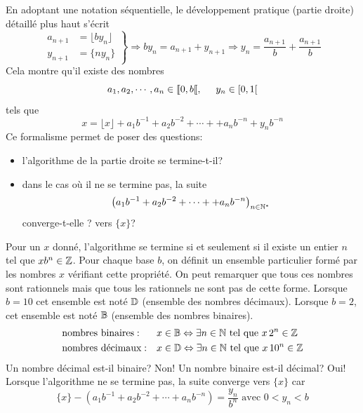 En adoptant une notation séquentielle, le développement pratique (partie droite) détaillé plus haut s'écrit
\begin{displaymath}
\left. 
\begin{aligned}
  a_{n+1} &= \lfloor by_n\rfloor \\ y_{n+1} &= \{ny_n\}
\end{aligned}
\right\rbrace
\Rightarrow by_n = a_{n+1} + y_{n+1}
\Rightarrow y_n = \frac{a_{n+1}}{b} + \frac{a_{n+1}}{b}
\end{displaymath}
Cela montre qu'il existe des nombres 
\begin{displaymath}
a_1, a_2, \cdots, a_n \in \llbracket 0, b\llbracket, \hspace{0.5cm} y_n \in [0,1[  
\end{displaymath}
tels que 
\begin{displaymath}
  x = \lfloor x \rfloor + a_1b^{-1} + a_2b^{-2} + \cdots + + a_nb^{-n} + y_nb^{-n}  
\end{displaymath}
Ce formalisme permet de poser des questions:
\begin{itemize}
  \item l'algorithme de la partie droite se termine-t-il?
  \item dans le cas où il ne se termine pas, la suite 
\begin{displaymath}
  \left( a_1b^{-1} + a_2b^{-2} + \cdots + + a_nb^{-n}\right)_{n\in \mathbb{N}^*}
\end{displaymath}
converge-t-elle ? vers $\{x\}$?
\end{itemize}
Pour un $x$ donné, l'algorithme se termine si et seulement si il existe un entier $n$ tel que $xb^n \in \mathbb{Z}$. Pour chaque base $b$, on définit un ensemble particulier formé par les nombres $x$ vérifiant cette propriété. On peut remarquer que tous ces nombres sont rationnels mais que tous les rationnels ne sont pas de cette forme. Lorsque $b=10$ cet ensemble est noté $\mathbb{D}$ (ensemble des nombres décimaux). Lorsque $b=2$, cet ensemble est noté $\mathbb{B}$ (ensemble des nombres binaires).
\begin{align*}
  &\text{nombres binaires}:& &x\in \mathbb{B} \Leftrightarrow \exists n \in\mathbb{N} \text{ tel que } x\,2^{n} \in \mathbb{Z} \\
  &\text{nombres décimaux}:& &x\in \mathbb{D} \Leftrightarrow \exists n \in\mathbb{N} \text{ tel que } x\,10^{n} \in \mathbb{Z} 
\end{align*}
Un nombre décimal est-il binaire? Non! Un nombre binaire est-il décimal? Oui!
Lorsque l'algorithme ne se termine pas, la suite converge vers $\{x\}$ car 
\begin{equation}
  \{x\} - \left( a_1b^{-1} + a_2b^{-2} + \cdots +  a_nb^{-n}\right)  = \frac{y_n}{b^n} \text{ avec } 0 < y_n < b \label{reste}
\end{equation}

